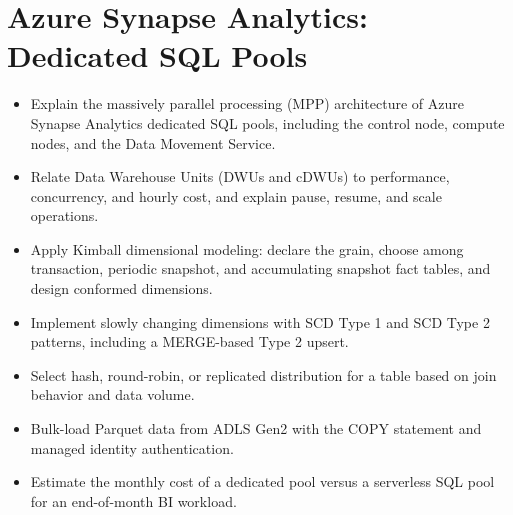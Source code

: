 \chapter{Azure Synapse Analytics: Dedicated SQL Pools}
%
\begin{objectives}
\begin{itemize}
    \item Explain the massively parallel processing (MPP) architecture of Azure Synapse Analytics dedicated SQL pools, including the control node, compute nodes, and the Data Movement Service.
    \item Relate Data Warehouse Units (DWUs and cDWUs) to performance, concurrency, and hourly cost, and explain pause, resume, and scale operations.
    \item Apply Kimball dimensional modeling: declare the grain, choose among transaction, periodic snapshot, and accumulating snapshot fact tables, and design conformed dimensions.
    \item Implement slowly changing dimensions with SCD Type 1 and SCD Type 2 patterns, including a MERGE-based Type 2 upsert.
    \item Select hash, round-robin, or replicated distribution for a table based on join behavior and data volume.
    \item Bulk-load Parquet data from ADLS Gen2 with the COPY statement and managed identity authentication.
    \item Estimate the monthly cost of a dedicated pool versus a serverless SQL pool for an end-of-month BI workload.
\end{itemize}
\end{objectives}

